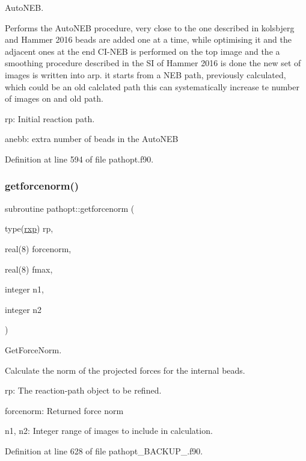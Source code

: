Auto\+N\+EB. 

Performs the Auto\+N\+EB procedure, very close to the one described in kolsbjerg and Hammer 2016 beads are added one at a time, while optimising it and the adjacent ones at the end C\+I-\/\+N\+EB is performed on the top image and the a smoothing procedure described in the SI of Hammer 2016 is done the new set of images is written into arp. it starts from a N\+EB path, previously calculated, which could be an old calclated path this can systematically increase te number of images on and old path.


\begin{DoxyItemize}
\item rp\+: Initial reaction path.
\item anebb\+: extra number of beads in the Auto\+N\+EB 
\end{DoxyItemize}

Definition at line 594 of file pathopt.\+f90.

\mbox{\label{namespacepathopt_ae8d2e965e25545bf3c0e215694716108}} 
\subsubsection{\texorpdfstring{getforcenorm()}{getforcenorm()}}
{\footnotesize\ttfamily subroutine pathopt\+::getforcenorm (\begin{DoxyParamCaption}\item[{type(\mbox{\hyperlink{structrpath_1_1rxp}{rxp}})}]{rp,  }\item[{real(8)}]{forcenorm,  }\item[{real(8)}]{fmax,  }\item[{integer}]{n1,  }\item[{integer}]{n2 }\end{DoxyParamCaption})}



Get\+Force\+Norm. 

Calculate the norm of the projected forces for the internal beads.


\begin{DoxyItemize}
\item rp\+: The reaction-\/path object to be refined.
\item forcenorm\+: Returned force norm
\item n1, n2\+: Integer range of images to include in calculation. 
\end{DoxyItemize}

Definition at line 628 of file pathopt\+\_\+\+B\+A\+C\+K\+U\+P\+\_.\+f90.

